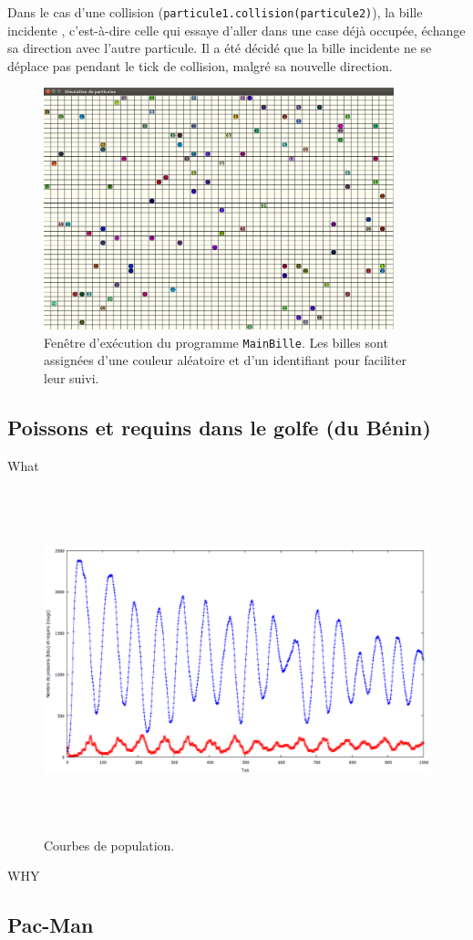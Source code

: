 \documentclass[a4paper]{article}
\begin{document}
\medskip
Dans le cas d'une collision (\texttt{particule1.collision(particule2)}), la bille \og incidente \fg{}, c'est-à-dire celle qui essaye d'aller dans une case déjà occupée, échange sa direction avec l'autre particule. Il a été décidé que la bille incidente ne se déplace pas pendant le tick de collision, malgré sa nouvelle direction.
 
\begin{figure}[!h]
\centering
\includegraphics[height=7cm]{particules.png}
\caption{Fenêtre d'exécution du programme \texttt{MainBille}. Les billes sont assignées d'une couleur aléatoire et d'un identifiant pour faciliter leur suivi.}
\end{figure}
\subsection{Poissons et requins dans le golfe (du Bénin)}
What
 
\begin{figure}[!h]
\centering
\includegraphics[height=10cm]{1000tours.png}
\caption{Courbes de population.}
\end{figure}

WHY
\subsection{Pac-Man}
\end{document}
